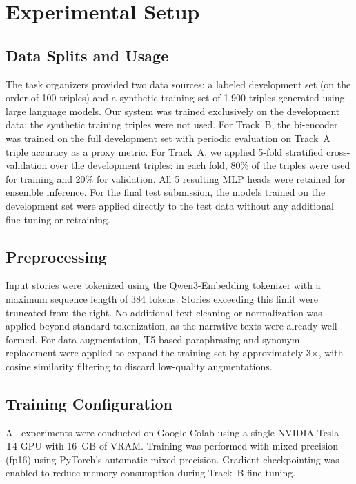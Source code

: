 \documentclass[11pt]{article}
\begin{document}
\section{Experimental Setup}
\label{sec:experimental_setup}

\subsection{Data Splits and Usage}

The task organizers provided two data sources: a labeled development set (on the order of 100 triples) and a synthetic training set of 1,900 triples generated using large language models. Our system was trained exclusively on the development data; the synthetic training triples were not used. For Track~B, the bi-encoder was trained on the full development set with periodic evaluation on Track~A triple accuracy as a proxy metric. For Track~A, we applied 5-fold stratified cross-validation over the development triples: in each fold, 80\% of the triples were used for training and 20\% for validation. All 5 resulting MLP heads were retained for ensemble inference. For the final test submission, the models trained on the development set were applied directly to the test data without any additional fine-tuning or retraining.

\subsection{Preprocessing}

Input stories were tokenized using the Qwen3-Embedding tokenizer with a maximum sequence length of 384 tokens. Stories exceeding this limit were truncated from the right. No additional text cleaning or normalization was applied beyond standard tokenization, as the narrative texts were already well-formed. For data augmentation, T5-based paraphrasing and synonym replacement were applied to expand the training set by approximately 3$\times$, with cosine similarity filtering to discard low-quality augmentations.

\subsection{Training Configuration}

All experiments were conducted on Google Colab using a single NVIDIA Tesla T4 GPU with 16~GB of VRAM. Training was performed with mixed-precision (fp16) using PyTorch's automatic mixed precision. Gradient checkpointing was enabled to reduce memory consumption during Track~B fine-tuning.
\end{document}
